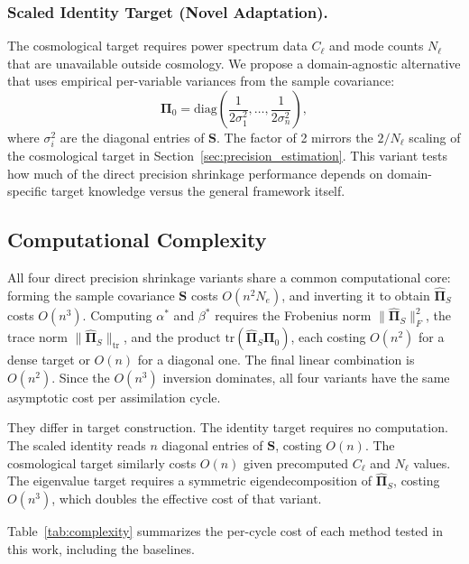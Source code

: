 \subsubsection{Scaled Identity Target (Novel Adaptation).}
\label{sec:scaled_target}

The cosmological target requires power spectrum data $C_\ell$ and mode counts $N_\ell$ that are unavailable outside cosmology. We propose a domain-agnostic alternative that uses empirical per-variable variances from the sample covariance:
\begin{equation}
\label{eq:scaled_target}
\boldsymbol{\Pi}_0 = \text{diag}\!\left(\frac{1}{2\sigma_1^2}, \ldots, \frac{1}{2\sigma_n^2}\right),
\end{equation}
where $\sigma_i^2$ are the diagonal entries of $\mathbf{S}$. The factor of 2 mirrors the $2/N_\ell$ scaling of the cosmological target in Section~\ref{sec:precision_estimation}. This variant tests how much of the direct precision shrinkage performance depends on domain-specific target knowledge versus the general framework itself.

\subsection{Computational Complexity}
\label{sec:complexity}

All four direct precision shrinkage variants share a common computational core: forming the sample covariance $\mathbf{S}$ costs $O(n^2 N_e)$, and inverting it to obtain $\hat{\boldsymbol{\Pi}}_S$ costs $O(n^3)$. Computing $\alpha^*$ and $\beta^*$ requires the Frobenius norm $\|\hat{\boldsymbol{\Pi}}_S\|_F^2$, the trace norm $\|\hat{\boldsymbol{\Pi}}_S\|_{\text{tr}}$, and the product $\text{tr}(\hat{\boldsymbol{\Pi}}_S \boldsymbol{\Pi}_0)$, each costing $O(n^2)$ for a dense target or $O(n)$ for a diagonal one. The final linear combination is $O(n^2)$. Since the $O(n^3)$ inversion dominates, all four variants have the same asymptotic cost per assimilation cycle.

They differ in target construction. The identity target requires no computation. The scaled identity reads $n$ diagonal entries of $\mathbf{S}$, costing $O(n)$. The cosmological target similarly costs $O(n)$ given precomputed $C_\ell$ and $N_\ell$ values. The eigenvalue target requires a symmetric eigendecomposition of $\hat{\boldsymbol{\Pi}}_S$, costing $O(n^3)$, which doubles the effective cost of that variant.

Table~\ref{tab:complexity} summarizes the per-cycle cost of each method tested in this work, including the baselines.

